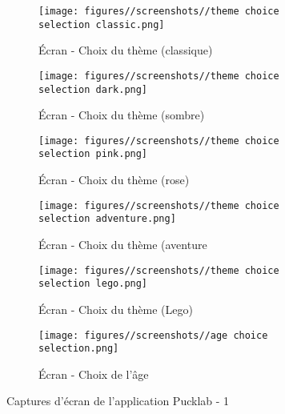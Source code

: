 \begin{figure}[H]
    \centering

    \begin{subfigure}{0.45\linewidth}
        \centering
        \texttt{[image: figures//screenshots//theme choice selection classic.png]}
        \caption{\label{fig:classic_theme_choice} Écran - Choix du thème (classique)}
    \end{subfigure}
    \hfill
    \begin{subfigure}{0.45\linewidth}
        \centering
        \texttt{[image: figures//screenshots//theme choice selection dark.png]}
        \caption{\label{fig:dark_theme_choice} Écran - Choix du thème (sombre)}
    \end{subfigure}

    \vspace{0.25cm}

    \begin{subfigure}{0.45\linewidth}
        \centering
        \texttt{[image: figures//screenshots//theme choice selection pink.png]}
        \caption{\label{fig:pink_theme_choice} Écran - Choix du thème (rose)}
    \end{subfigure}
    \hfill
    \begin{subfigure}{0.45\linewidth}
        \centering
        \texttt{[image: figures//screenshots//theme choice selection adventure.png]}
        \caption{\label{fig:adventure_theme_choice} Écran - Choix du thème (aventure}
    \end{subfigure}

    \vspace{0.25cm}

    \begin{subfigure}{0.45\linewidth}
        \centering
        \texttt{[image: figures//screenshots//theme choice selection lego.png]}
        \caption{\label{fig:lego_theme_choice} Écran - Choix du thème (Lego)}
    \end{subfigure}
    \hfill
    \begin{subfigure}{0.45\linewidth}
        \centering
        \texttt{[image: figures//screenshots//age choice selection.png]}
        \caption{\label{fig:age_choice} Écran - Choix de l'âge}
    \end{subfigure}

    \caption{\label{fig:screenshots-1} Captures d'écran de l'application Pucklab - 1}
\end{figure}


